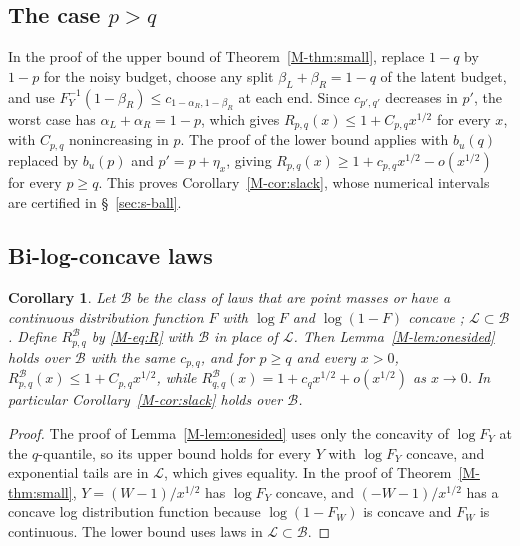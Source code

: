 \documentclass[11pt]{article}
\newtheorem{corollary}{Corollary}
\newcommand{\LC}{\mathcal{L}}
\begin{document}
\subsection*{The case $p > q$}

In the proof of the upper bound of Theorem~\ref{M-thm:small}, replace $1 - q$ by $1 - p$ for the noisy budget, choose any split $\beta_L + \beta_R = 1 - q$ of the latent budget, and use $F_Y^{-1}(1-\beta_R) \le c_{1-\alpha_R, 1-\beta_R}$ at each end. Since $c_{p',q'}$ decreases in $p'$, the worst case has $\alpha_L + \alpha_R = 1 - p$, which gives $R_{p,q}(x) \le 1 + C_{p,q}x^{1/2}$ for every $x$, with $C_{p,q}$ nonincreasing in $p$. The proof of the lower bound applies with $b_u(q)$ replaced by $b_u(p)$ and $p' = p + \eta_x$, giving $R_{p,q}(x) \ge 1 + c_{p,q}x^{1/2} - o(x^{1/2})$ for every $p \ge q$. This proves Corollary~\ref{M-cor:slack}, whose numerical intervals are certified in \S~\ref{sec:s-ball}.

\subsection*{Bi-log-concave laws}

\begin{corollary}\label{cor:blc}
Let $\mathcal B$ be the class of laws that are point masses or have a continuous distribution function $F$ with $\log F$ and $\log(1-F)$ concave \citep{dumbgen2017}; $\LC \subset \mathcal B$. Define $R^{\mathcal B}_{p,q}$ by \eqref{M-eq:R} with $\mathcal B$ in place of $\LC$. Then Lemma~\ref{M-lem:onesided} holds over $\mathcal B$ with the same $c_{p,q}$, and for $p \ge q$ and every $x > 0$, $R^{\mathcal B}_{p,q}(x) \le 1 + C_{p,q}x^{1/2}$, while $R^{\mathcal B}_{q,q}(x) = 1 + c_qx^{1/2} + o(x^{1/2})$ as $x \to 0$. In particular Corollary~\ref{M-cor:slack} holds over $\mathcal B$.
\end{corollary}

\begin{proof}
The proof of Lemma~\ref{M-lem:onesided} uses only the concavity of $\log F_Y$ at the $q$-quantile, so its upper bound holds for every $Y$ with $\log F_Y$ concave, and exponential tails are in $\LC$, which gives equality. In the proof of Theorem~\ref{M-thm:small}, $Y = (W - 1)/x^{1/2}$ has $\log F_Y$ concave, and $(-W - 1)/x^{1/2}$ has a concave log distribution function because $\log(1 - F_W)$ is concave and $F_W$ is continuous. The lower bound uses laws in $\LC \subset \mathcal B$.
\end{proof}
\end{document}
